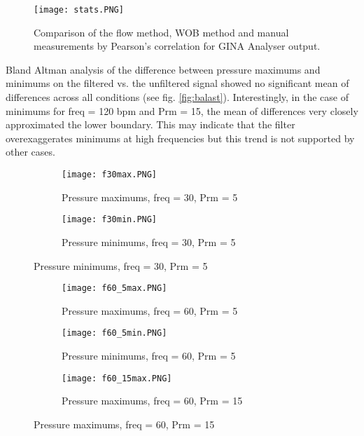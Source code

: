 \documentclass[12pt, openany, oneside]{book}
\begin{document}



\begin{figure}[H]
	\centering
		\texttt{[image: stats.PNG]}
		\caption{Comparison of the flow method, WOB method and manual measurements by Pearson's correlation for GINA Analyser output.}
		\label{fig:stats}	
\end{figure}

\pagebreak
Bland Altman analysis of the difference between pressure maximums and minimums on the filtered vs. the unfiltered signal showed no significant mean of differences across all conditions (see fig. \ref{fig:balast}). Interestingly, in the case of minimums for freq = 120 bpm and Prm = 15, the mean of differences very closely approximated the lower boundary. This may indicate that the filter overexaggerates minimums at high frequencies but this trend is not supported by other cases.\\
\begin{figure}[H]
	\begin{subfigure}[H]{0.8\textwidth}
		\centering
		\texttt{[image: f30max.PNG]}		
		\caption {Pressure maximums, freq = 30, Prm = 5}
		\label{fig:f30max}
	\end{subfigure}
	\hfill
	\begin{subfigure}[H]{0.8\textwidth}
		\centering
		\texttt{[image: f30min.PNG]}		
		\caption{Pressure minimums, freq = 30, Prm = 5}
		\label{fig:f30min}
	\end{subfigure}
\end{figure}
\pagebreak
\begin{figure}\ContinuedFloat
\begin{subfigure}[H]{0.8\textwidth}
		\centering
		\texttt{[image: f60\_5max.PNG]}		
		\caption{Pressure maximums, freq = 60, Prm = 5}
		\label{fig:f60_5max}
	\end{subfigure}	
	\begin{subfigure}[H]{0.8\textwidth}
		\centering
		\texttt{[image: f60\_5min.PNG]}		
		\caption{Pressure minimums, freq = 60, Prm = 5}
		\label{fig:f60_5min}
	\end{subfigure}
	\hfill
\begin{subfigure}[H]{0.8\textwidth}
		\centering
		\texttt{[image: f60\_15max.PNG]}		
		\caption{Pressure maximums, freq = 60, Prm = 15}
		\label{fig:f60_15max}
	\end{subfigure}
\end{figure}
\end{document}
